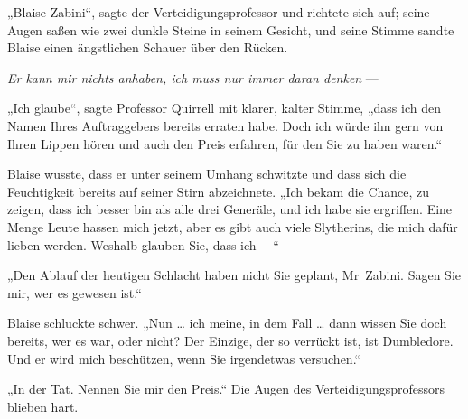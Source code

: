 „Blaise Zabini“, sagte der Verteidigungsprofessor und richtete sich auf; seine Augen saßen wie zwei dunkle Steine in seinem Gesicht, und seine Stimme sandte Blaise einen ängstlichen Schauer über den Rücken.

\emph{Er kann mir nichts anhaben, ich muss nur immer daran denken} —

„Ich glaube“, sagte Professor Quirrell mit klarer, kalter Stimme, „dass ich den Namen Ihres Auftraggebers bereits erraten habe. Doch ich würde ihn gern von Ihren Lippen hören und auch den Preis erfahren, für den Sie zu haben waren.“

Blaise wusste, dass er unter seinem Umhang schwitzte und dass sich die Feuchtigkeit bereits auf seiner Stirn abzeichnete.
„Ich bekam die Chance, zu zeigen, dass ich besser bin als alle drei Generäle, und ich habe sie ergriffen. Eine Menge Leute hassen mich jetzt, aber es gibt auch viele Slytherins, die mich dafür lieben werden. Weshalb glauben Sie, dass ich —“

„Den Ablauf der heutigen Schlacht haben nicht Sie geplant, Mr~Zabini. Sagen Sie mir, wer es gewesen ist.“

Blaise schluckte schwer.
„Nun … ich meine, in dem Fall … dann wissen Sie doch bereits, wer es war, oder nicht? Der Einzige, der so verrückt ist, ist Dumbledore. Und er wird mich beschützen, wenn Sie irgendetwas versuchen.“

„In der Tat. Nennen Sie mir den Preis.“ Die Augen des Verteidigungsprofessors blieben hart.

